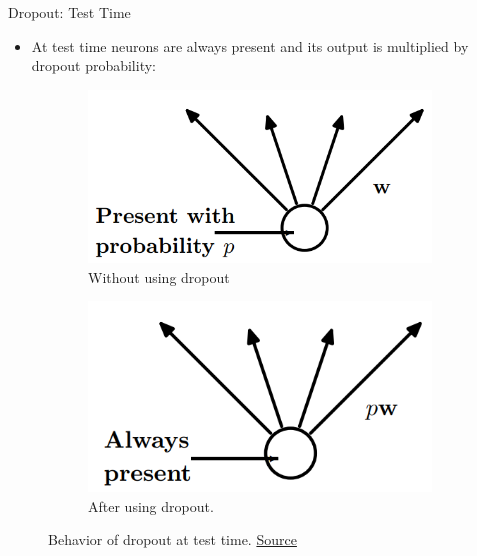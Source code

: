 \begin{frame}{Dropout: Test Time}
\begin{itemize}
	\item At test time neurons are always present and its output is multiplied by dropout probability:
\end{itemize}
\begin{figure}[H]
	\centering
	\begin{subfigure}[b]{0.3\textwidth}
		\centering
		\includegraphics[width=\textwidth]{Figs/dropout-test time-before.png}
		\caption{Without using dropout}
		\label{fig:dropout-test time-before}
	\end{subfigure}
	\begin{subfigure}[b]{0.3\textwidth}
		\centering
		\includegraphics[width=\textwidth]{Figs/dropout-test time-after.png}
		\caption{After using dropout.}
		\label{fig:dropout-test time-after}
	\end{subfigure}
	\caption{Behavior of dropout at test time. \href{https://www.cs.toronto.edu/~hinton/absps/JMLRdropout.pdf}{Source}}
\end{figure}
\end{frame}



